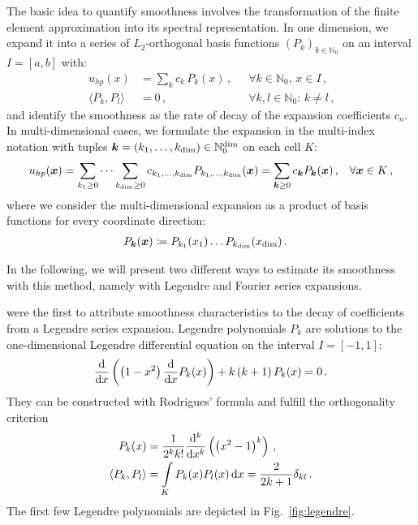 The basic idea to quantify smoothness involves the transformation of the finite element approximation into its spectral representation. In one dimension, we expand it into a series of $L_2$-orthogonal basis functions $(P_k)_{k\in\mathbb{N}_0}$ on an interval $I = [a,b]$ with:
\begin{align}
u_{hp}(x) &= \sum\limits_{k} c_k \, P_k(x) \,\text{,} && \forall k \in \mathbb{N}_0 \text{, } x \in I \,\text{,} \\
\langle P_k, P_l \rangle &= 0 \,\text{,} && \forall k,l \in \mathbb{N}_0 \text{: } k \neq l \,\text{,}
\end{align}
and identify the smoothness as the rate of decay of the expansion coefficients $c_n$. In multi-dimensional cases, we formulate the expansion in the multi-index notation with tuples $\tuple{k} = (k_1, \dots, k_\text{dim}) \in \mathbb{N}_0^\text{dim}$ on each cell $K$:
\begin{align}
u_{hp}(\vec{x}) &= \sum\limits_{k_1 \geq 0} \dots \sum\limits_{k_\text{dim} \geq 0} c_{k_1, \dots, k_{\text{dim}}} P_{k_1, \dots, k_{\text{dim}}}(\vec{x}) = \sum_{\tuple{k} \geq 0} c_\tuple{k} P_\tuple{k}(\vec{x}) \,\text{,}  & \forall \vec{x} \in K \,\text{,}
\end{align}
where we consider the multi-dimensional expansion as a product of basis functions for every coordinate direction:
\begin{align}
\label{eq:spectral_multi} P_{\tuple{k}}(\vec{x}) &\coloneqq P_{k_1}(x_1) \dots P_{k_\text{dim}}(x_\text{dim}) \,\text{.}
\end{align}

In the following, we will present two different ways to estimate its smoothness with this method, namely with Legendre and Fourier series expansions.

\textcite{mavriplis1994} were the first to attribute smoothness characteristics to the decay of coefficients from a Legendre series expansion. Legendre polynomials $P_k$ are solutions to the one-dimensional Legendre differential equation on the interval $I = [-1,1]$:
\begin{align}
\frac{\mathop{}\!\mathrm{d}}{\mathop{}\!\mathrm{d}x} \left(\left(1-x^{2}\right) \frac{\mathop{}\!\mathrm{d}}{\mathop{}\!\mathrm{d}x} P_k(x)\right)+ k \left(k+1\right) P_k(x)=0 \,\text{.}
\end{align}
They can be constructed with Rodrigues' formula and fulfill the orthogonality criterion
\begin{align}
P_k(x) &= \frac{1}{2^k k!} \frac{\mathop{}\!\mathrm{d}^k}{\mathop{}\!\mathrm{d}x^k} \left( \left(x^2 - 1\right)^k \right) \,\text{,} \\
\label{eq:legendre_orthogonal} \langle P_k, P_l\rangle &= \int\limits_K P_k(x) P_l(x) \mathop{}\!\mathrm{d}x = \frac{2}{2 k+1} \delta_{k l} \,\text{.}
\end{align}
The first few Legendre polynomials are depicted in Fig.~\ref{fig:legendre}. \textcite{dealiilegendre}

